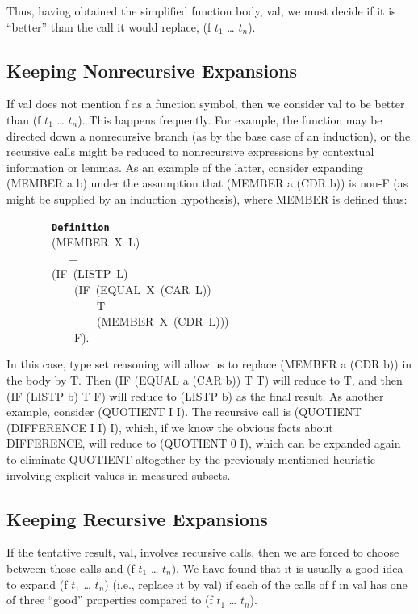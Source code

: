 \documentclass[11pt]{book}
\newenvironment{pubasis}{\begin{flushleft}\ttfamily\small}{\normalsize\rmfamily\end{flushleft}}
\newcommand{\axiomordefinition}[1]{\vspace{6pt}\texttt{\textbf{#1}}}
\newcommand{\pubdefaulttextsize}{\large}
\begin{document}
Thus, having obtained the simplified function body, val, we must decide
if it is ``better'' than the call it would replace, (f $t_{1}$ \ldots{} $t_{n}$).
\subsection{Keeping Nonrecursive Expansions}
\pubdefaulttextsize
If val does not mention f as a function symbol, then we consider val to be
better than (f $t_{1}$ \ldots{} $t_{n}$).
This happens frequently.
For example, the function may be directed down a nonrecursive branch (as by
the base case of an induction), or the recursive calls might be reduced
to nonrecursive expressions by contextual information or lemmas.
As an example of the latter, consider expanding (MEMBER a b) 
under the assumption that (MEMBER a (CDR b)) is non-F (as might be
supplied by an induction hypothesis), where MEMBER is defined thus:
\begin{pubasis}
~~~~~~~~\axiomordefinition{Definition}\\
~~~~~~~~(MEMBER~X~L)\\
~~~~~~~~~~~=\\
~~~~~~~~(IF~(LISTP~L)\\
~~~~~~~~~~~~(IF~(EQUAL~X~(CAR~L))\\
~~~~~~~~~~~~~~~~T\\
~~~~~~~~~~~~~~~~(MEMBER~X~(CDR~L)))\\
~~~~~~~~~~~~F).\\
\end{pubasis}
In this case,
type set reasoning will allow us to replace (MEMBER a (CDR b)) in the
body by T.  Then (IF (EQUAL a (CAR b)) T T) will reduce to T, and then
(IF (LISTP b) T F) will reduce to (LISTP b) as the final result.
As another example,
consider (QUOTIENT I I).  The recursive call is (QUOTIENT (DIFFERENCE I I) I),
which, if we know the obvious facts about DIFFERENCE, will reduce to
(QUOTIENT 0 I), which can be expanded again to eliminate QUOTIENT altogether
by the previously mentioned heuristic involving explicit values in measured
subsets.
\subsection{Keeping Recursive Expansions}
\pubdefaulttextsize
If the tentative result, val,  involves recursive calls, then we are 
forced to choose between those calls and (f $t_{1}$ \ldots{} $t_{n}$).
We have found that it is usually a good idea to expand (f $t_{1}$ \ldots{} $t_{n}$)
(i.e., replace it by val) if each of the calls of f in val has one of
three ``good'' properties compared to (f $t_{1}$ \ldots{} $t_{n}$).
\end{document}
